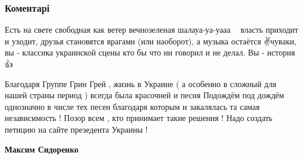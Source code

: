  
 
 
 
 
\subsubsection{Коментарі}
\label{sec:27_07_2021.fb.green_grey.gruppa.ukr.1.grin_grey_ofis_prezidenta_jazyk_mova.cmt}

\begin{itemize}

 

Есть на свете свободная как ветер вечнозеленая шалауа-уа-уааа 🎸💪 власть
приходит и уходит, друзья становятся врагами (или наоборот), а музыка остаётся
✌️чуваки, вы - классика украинской сцены кто бы что ни говорил и не делал. Вы -
история 👍

 

Благодаря Группе Грин Грей , жизнь в Украине ( а особенно в сложный для нашей
страны период ) всегда была красочней и песня Подождём под дождём однозначно в
числе тех песен благодаря которым и закалялась та самая независимость ! Позор
всем , кто принимает такие решения ! Надо создать петицию на сайте презедента
Украины !

\begin{itemize}
 
\textbf{Максим Сидоренко} 


\end{itemize}
\end{itemize}
